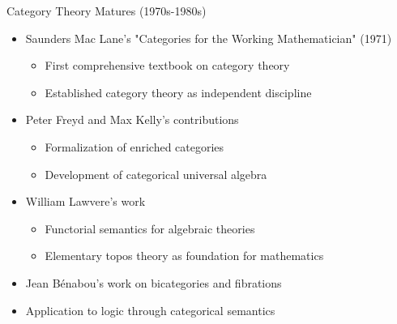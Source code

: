 \documentclass{beamer}
\begin{document}
\begin{frame}{Category Theory Matures (1970s-1980s)}
    \begin{itemize}
        \item Saunders Mac Lane's "Categories for the Working Mathematician" (1971)
            \begin{itemize}
                \item First comprehensive textbook on category theory
                \item Established category theory as independent discipline
            \end{itemize}
        \item Peter Freyd and Max Kelly's contributions
            \begin{itemize}
                \item Formalization of enriched categories
                \item Development of categorical universal algebra
            \end{itemize}
        \item William Lawvere's work
            \begin{itemize}
                \item Functorial semantics for algebraic theories
                \item Elementary topos theory as foundation for mathematics
            \end{itemize}
        \item Jean Bénabou's work on bicategories and fibrations
        \item Application to logic through categorical semantics
    \end{itemize}
\end{frame}
\end{document}
